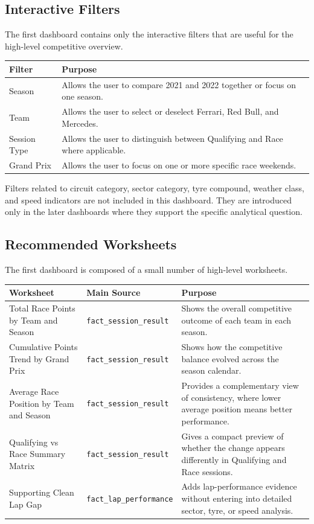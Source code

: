 \documentclass[12pt,a4paper]{article}
\begin{document}
	\subsection{Interactive Filters}
	
	The first dashboard contains only the interactive filters that are useful for the high-level competitive overview.
	
	\begin{longtable}{p{5cm} p{8cm}}
		\toprule
		\textbf{Filter} & \textbf{Purpose} \\
		\midrule
		Season & Allows the user to compare 2021 and 2022 together or focus on one season. \\
		Team & Allows the user to select or deselect Ferrari, Red Bull, and Mercedes. \\
		Session Type & Allows the user to distinguish between Qualifying and Race where applicable. \\
		Grand Prix & Allows the user to focus on one or more specific race weekends. \\
		\bottomrule
	\end{longtable}
	
	Filters related to circuit category, sector category, tyre compound, weather class, and speed indicators are not included in this dashboard.
	They are introduced only in the later dashboards where they support the specific analytical question.
	
	
	\subsection{Recommended Worksheets}
	
	The first dashboard is composed of a small number of high-level worksheets.
	
	\begin{longtable}{p{4cm} p{4cm} p{6cm}}
		\toprule
		\textbf{Worksheet} & \textbf{Main Source} & \textbf{Purpose} \\
		\midrule
		Total Race Points by Team and Season
		& \texttt{fact\_session\_result}
		& Shows the overall competitive outcome of each team in each season. \\
		
		Cumulative Points Trend by Grand Prix
		& \texttt{fact\_session\_result}
		& Shows how the competitive balance evolved across the season calendar. \\
		
		Average Race Position by Team and Season
		& \texttt{fact\_session\_result}
		& Provides a complementary view of consistency, where lower average position means better performance. \\
		
		Qualifying vs Race Summary Matrix
		& \texttt{fact\_session\_result}
		& Gives a compact preview of whether the change appears differently in Qualifying and Race sessions. \\
		
		Supporting Clean Lap Gap
		& \texttt{fact\_lap\_performance}
		& Adds lap-performance evidence without entering into detailed sector, tyre, or speed analysis. \\
		\bottomrule
	\end{longtable}
	
\end{document}
